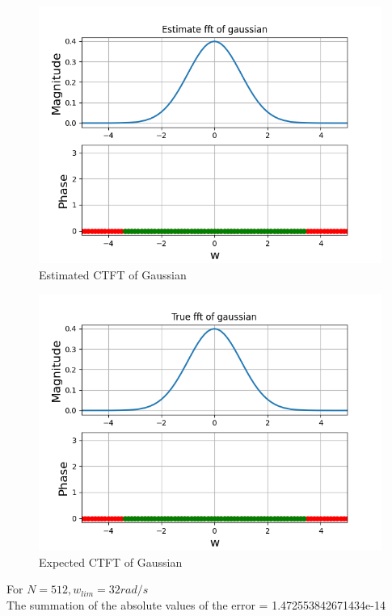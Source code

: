 \documentclass{article}
\begin{document}
\begin{figure}[h!]
\centering
\includegraphics[scale=0.6]{Figure_8.png}
\caption{Estimated CTFT of Gaussian}
\label{fig:universe}
\end{figure}

\begin{figure}[h!]
\centering
\includegraphics[scale=0.6]{Figure_9.png}
\caption{Expected CTFT of Gaussian}
\label{fig:universe}
\end{figure}
For $N=512, w_{lim}=32 rad/s$ \\
The summation of the absolute values of the error = 1.472553842671434e-14\newline


\clearpage
\end{document}
